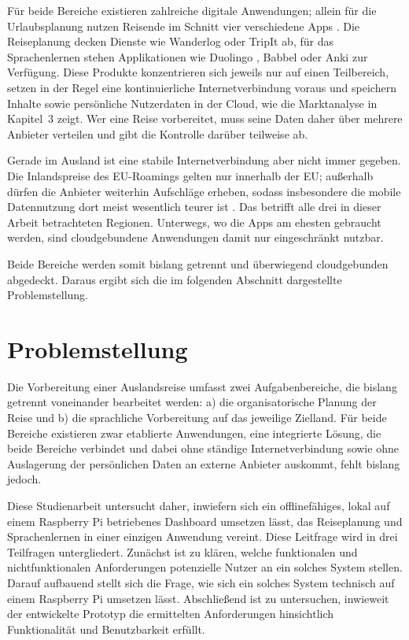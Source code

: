 \documentclass[12pt,a4paper]{scrreprt}
\begin{document}
Für beide Bereiche existieren zahlreiche digitale Anwendungen; allein für die Urlaubsplanung nutzen Reisende im Schnitt vier verschiedene Apps \cite{bitkom2019}. Die Reiseplanung decken Dienste wie Wanderlog \cite{wanderlog} oder TripIt \cite{tripit} ab, für das Sprachenlernen stehen Applikationen wie Duolingo \cite{duolingo}, Babbel \cite{babbel} oder Anki \cite{anki} zur Verfügung. Diese Produkte konzentrieren sich jeweils nur auf einen Teilbereich, setzen in der Regel eine kontinuierliche Internetverbindung voraus und speichern Inhalte sowie persönliche Nutzerdaten in der Cloud, wie die Marktanalyse in Kapitel~3 zeigt. Wer eine Reise vorbereitet, muss seine Daten daher über mehrere Anbieter verteilen und gibt die Kontrolle darüber teilweise ab.

Gerade im Ausland ist eine stabile Internetverbindung aber nicht immer gegeben. Die Inlandspreise des EU-Roamings gelten nur innerhalb der EU; außerhalb dürfen die Anbieter weiterhin Aufschläge erheben, sodass insbesondere die mobile Datennutzung dort meist wesentlich teurer ist \cite{bnetza2023, vznrw}. Das betrifft alle drei in dieser Arbeit betrachteten Regionen. Unterwegs, wo die Apps am ehesten gebraucht werden, sind cloudgebundene Anwendungen damit nur eingeschränkt nutzbar.

Beide Bereiche werden somit bislang getrennt und überwiegend cloudgebunden abgedeckt. Daraus ergibt sich die im folgenden Abschnitt dargestellte Problemstellung.

\section{Problemstellung}
Die Vorbereitung einer Auslandsreise umfasst zwei Aufgabenbereiche, die bislang getrennt voneinander bearbeitet werden: a) die organisatorische Planung der Reise und b) die sprachliche Vorbereitung auf das jeweilige Zielland. Für beide Bereiche existieren zwar etablierte Anwendungen, eine integrierte Lösung, die beide Bereiche verbindet und dabei ohne ständige Internetverbindung sowie ohne Auslagerung der persönlichen Daten an externe Anbieter auskommt, fehlt bislang jedoch.

Diese Studienarbeit untersucht daher, inwiefern sich ein offlinefähiges, lokal auf einem Raspberry Pi betriebenes Dashboard umsetzen lässt, das Reiseplanung und Sprachenlernen in einer einzigen Anwendung vereint. Diese Leitfrage wird in drei Teilfragen untergliedert. Zunächst ist zu klären, welche funktionalen und nichtfunktionalen Anforderungen potenzielle Nutzer an ein solches System stellen. Darauf aufbauend stellt sich die Frage, wie sich ein solches System technisch auf einem Raspberry Pi umsetzen lässt. Abschließend ist zu untersuchen, inwieweit der entwickelte Prototyp die ermittelten Anforderungen hinsichtlich Funktionalität und Benutzbarkeit erfüllt.
\end{document}
